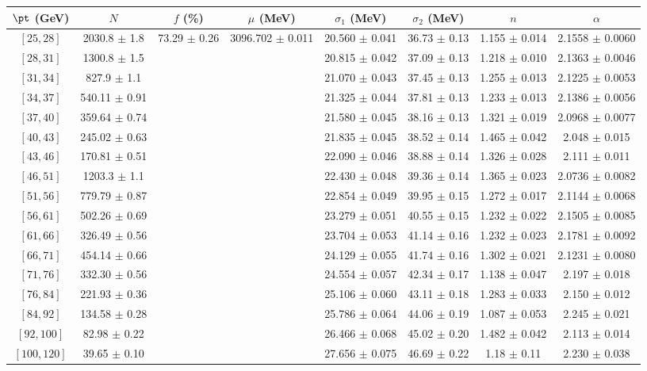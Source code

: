 \begin{tabular}{c||c|c|c|c|c|c|c}
$\pt$ (GeV) & $N$ & $f$ (\%) & $\mu$ (MeV) & $\sigma_1$ (MeV) & $\sigma_2$ (MeV) & $n$ & $\alpha$ \\
\hline
$[25, 28]$ & 2030.8 $\pm$ 1.8 & \multirow{17}{*}{73.29 $\pm$ 0.26} & \multirow{17}{*}{3096.702 $\pm$ 0.011} & 20.560 $\pm$ 0.041 & 36.73 $\pm$ 0.13 & 1.155 $\pm$ 0.014 & 2.1558 $\pm$ 0.0060\\
$[28, 31]$ & 1300.8 $\pm$ 1.5 &  &  & 20.815 $\pm$ 0.042 & 37.09 $\pm$ 0.13 & 1.218 $\pm$ 0.010 & 2.1363 $\pm$ 0.0046\\
$[31, 34]$ & 827.9 $\pm$ 1.1 &  &  & 21.070 $\pm$ 0.043 & 37.45 $\pm$ 0.13 & 1.255 $\pm$ 0.013 & 2.1225 $\pm$ 0.0053\\
$[34, 37]$ & 540.11 $\pm$ 0.91 &  &  & 21.325 $\pm$ 0.044 & 37.81 $\pm$ 0.13 & 1.233 $\pm$ 0.013 & 2.1386 $\pm$ 0.0056\\
$[37, 40]$ & 359.64 $\pm$ 0.74 &  &  & 21.580 $\pm$ 0.045 & 38.16 $\pm$ 0.13 & 1.321 $\pm$ 0.019 & 2.0968 $\pm$ 0.0077\\
$[40, 43]$ & 245.02 $\pm$ 0.63 &  &  & 21.835 $\pm$ 0.045 & 38.52 $\pm$ 0.14 & 1.465 $\pm$ 0.042 & 2.048 $\pm$ 0.015\\
$[43, 46]$ & 170.81 $\pm$ 0.51 &  &  & 22.090 $\pm$ 0.046 & 38.88 $\pm$ 0.14 & 1.326 $\pm$ 0.028 & 2.111 $\pm$ 0.011\\
$[46, 51]$ & 1203.3 $\pm$ 1.1 &  &  & 22.430 $\pm$ 0.048 & 39.36 $\pm$ 0.14 & 1.365 $\pm$ 0.023 & 2.0736 $\pm$ 0.0082\\
$[51, 56]$ & 779.79 $\pm$ 0.87 &  &  & 22.854 $\pm$ 0.049 & 39.95 $\pm$ 0.15 & 1.272 $\pm$ 0.017 & 2.1144 $\pm$ 0.0068\\
$[56, 61]$ & 502.26 $\pm$ 0.69 &  &  & 23.279 $\pm$ 0.051 & 40.55 $\pm$ 0.15 & 1.232 $\pm$ 0.022 & 2.1505 $\pm$ 0.0085\\
$[61, 66]$ & 326.49 $\pm$ 0.56 &  &  & 23.704 $\pm$ 0.053 & 41.14 $\pm$ 0.16 & 1.232 $\pm$ 0.023 & 2.1781 $\pm$ 0.0092\\
$[66, 71]$ & 454.14 $\pm$ 0.66 &  &  & 24.129 $\pm$ 0.055 & 41.74 $\pm$ 0.16 & 1.302 $\pm$ 0.021 & 2.1231 $\pm$ 0.0080\\
$[71, 76]$ & 332.30 $\pm$ 0.56 &  &  & 24.554 $\pm$ 0.057 & 42.34 $\pm$ 0.17 & 1.138 $\pm$ 0.047 & 2.197 $\pm$ 0.018\\
$[76, 84]$ & 221.93 $\pm$ 0.36 &  &  & 25.106 $\pm$ 0.060 & 43.11 $\pm$ 0.18 & 1.283 $\pm$ 0.033 & 2.150 $\pm$ 0.012\\
$[84, 92]$ & 134.58 $\pm$ 0.28 &  &  & 25.786 $\pm$ 0.064 & 44.06 $\pm$ 0.19 & 1.087 $\pm$ 0.053 & 2.245 $\pm$ 0.021\\
$[92, 100]$ & 82.98 $\pm$ 0.22 &  &  & 26.466 $\pm$ 0.068 & 45.02 $\pm$ 0.20 & 1.482 $\pm$ 0.042 & 2.113 $\pm$ 0.014\\
$[100, 120]$ & 39.65 $\pm$ 0.10 &  &  & 27.656 $\pm$ 0.075 & 46.69 $\pm$ 0.22 & 1.18 $\pm$ 0.11 & 2.230 $\pm$ 0.038\\
\end{tabular}
